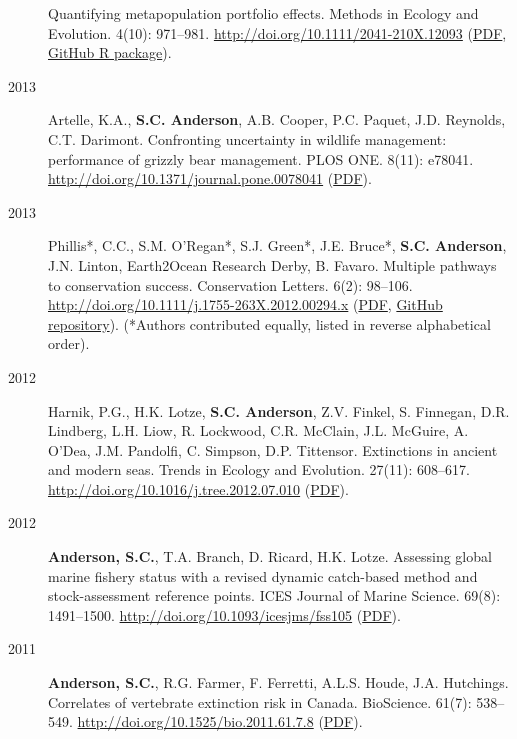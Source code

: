 \begin{description}
Quantifying metapopulation portfolio effects. Methods in Ecology and
Evolution. 4(10): 971--981. \url{http://doi.org/10.1111/2041-210X.12093}
(\href{https://dl.dropboxusercontent.com/u/254940/papers/Anderson_etal_2013_ecological_prophets_with_SOM.pdf}{PDF},
\href{https://github.com/seananderson/ecofolio}{GitHub R package}).
\item[2013]
Artelle, K.A., \textbf{S.C. Anderson}, A.B. Cooper, P.C. Paquet, J.D.
Reynolds, C.T. Darimont. Confronting uncertainty in wildlife management:
performance of grizzly bear management. PLOS ONE. 8(11): e78041.
\url{http://doi.org/10.1371/journal.pone.0078041}
(\href{http://www.plosone.org/article/fetchObject.action?uri=info\%3Adoi\%2F10.1371\%2Fjournal.pone.0078041\&representation=PDF}{PDF}).
\item[2013]
Phillis*, C.C., S.M. O'Regan*, S.J. Green*, J.E. Bruce*, \textbf{S.C.
Anderson}, J.N. Linton, Earth2Ocean Research Derby, B. Favaro. Multiple
pathways to conservation success. Conservation Letters. 6(2): 98--106.
\url{http://doi.org/10.1111/j.1755-263X.2012.00294.x}
(\href{https://dl.dropboxusercontent.com/u/254940/papers/Phillis_etal_2012_Multiple_pathways_to_conservation_success.pdf}{PDF},
\href{https://github.com/seananderson/conservation_pathways}{GitHub
repository}). (*Authors contributed equally, listed in reverse
alphabetical order).
\item[2012]
Harnik, P.G., H.K. Lotze, \textbf{S.C. Anderson}, Z.V. Finkel, S.
Finnegan, D.R. Lindberg, L.H. Liow, R. Lockwood, C.R. McClain, J.L.
McGuire, A. O'Dea, J.M. Pandolfi, C. Simpson, D.P. Tittensor.
Extinctions in ancient and modern seas. Trends in Ecology and Evolution.
27(11): 608--617. \url{http://doi.org/10.1016/j.tree.2012.07.010}
(\href{https://dl.dropboxusercontent.com/u/254940/papers/Harnik_etal_2012_Extinctions_in_ancient_and_modern_seas.pdf}{PDF}).
\item[2012]
\textbf{Anderson, S.C.}, T.A. Branch, D. Ricard, H.K. Lotze. Assessing
global marine fishery status with a revised dynamic catch-based method
and stock-assessment reference points. ICES Journal of Marine Science.
69(8): 1491--1500. \url{http://doi.org/10.1093/icesjms/fss105}
(\href{http://icesjms.oxfordjournals.org/cgi/reprint/fss105?ijkey=pFRzMGEDycomI3X\&keytype=ref}{PDF}).
\item[2011]
\textbf{Anderson, S.C.}, R.G. Farmer, F. Ferretti, A.L.S. Houde, J.A.
Hutchings. Correlates of vertebrate extinction risk in Canada.
BioScience. 61(7): 538--549.
\url{http://doi.org/10.1525/bio.2011.61.7.8}
(\href{https://dl.dropboxusercontent.com/u/254940/papers/Anderson_etal_2011_BioScience_with_supplement.pdf}{PDF}).

\end{description}

